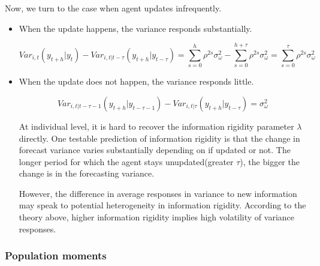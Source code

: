 \documentclass[]{article}
\begin{document}
Now, we turn to the case when agent updates infrequently. 

\begin{itemize}
\item When the update happens, the variance responds substantially.  

$$Var_{i,t}(y_{t+h}|y_t) - Var_{i,t|t-\tau}(y_{t+h}|y_{t-\tau}) = \sum^{h}_{s=0}\rho^{2s} \sigma^2_{\omega} - \sum^{h+\tau}_{s=0}\rho^{2s} \sigma^2_{\omega} = \sum^{\tau}_{s=0} \rho^{2s}\sigma^2_{\omega}$$

\item When the update does not happen, the variance responds little. 

$$Var_{i,t|t-\tau-1}(y_{t+h}|y_{t-\tau-1}) - Var_{i,t|\tau}(y_{t+h}|y_{t-\tau}) = \sigma^2_{\omega}$$

At individual level, it is hard to recover the information rigidity parameter $\lambda$ directly. One testable prediction of information rigidity is that the change in forecast variance varies substantially depending on if updated or not. The longer period for which the agent stays unupdated(greater $\tau$), the bigger the change is in the forecasting variance. 

However, the difference in average responses in variance to new information may speak to potential heterogeneity in information rigidity. According to the theory above, higher information rigidity implies high volatility of variance responses.  
\end{itemize}

\subsubsection{Population moments} 
	
\end{document}
